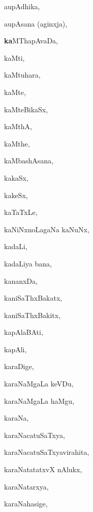 \begin{multicols}{3}
{\noindent
{aupAdhika}, \pageref{aupAdhika}

\noindent
{aupAsana (aginxja)}, \pageref{aupAsana (aginxja)}

\noindent
{{\large\textbf{ka}}MThapAvaDa}, \pageref{kaMThapAvaDa}

\noindent
{kaMti}, \pageref{kaMti}

\noindent
{kaMtuhara}, \pageref{kaMtuhara}

\noindent
{kaMte}, \pageref{kaMte}

\noindent
{kaMteBikaSx}, \pageref{kaMteBikaSx}

\noindent
{kaMthA}, \pageref{kaMthA}

\noindent
{kaMthe}, \pageref{kaMthe}

\noindent
{kaMbashAsana}, \pageref{kaMbashAsana}

\noindent
{kakaSx}, \pageref{kakaSx}

\noindent
{kakeSx}, \pageref{kakeSx}

\noindent
{kaTaTxLe}, \pageref{kaTaTxLe}

\noindent
{kaNiNxnoLagaNa kaNuNx}, \pageref{kaNiNxnoLagaNa kaNuNx}

\noindent
{kadaLi}, \pageref{kadaLi}

\noindent
{kadaLiya bana}, \pageref{kadaLiya bana}

\noindent
{kananxDa}, \pageref{kananxDa}

\noindent
{kaniSaThxBakatx}, \pageref{kaniSaThxBakatx}

\noindent
{kaniSaThxBakitx}, \pageref{kaniSaThxBakitx}

\noindent
{kapAlaBAti}, \pageref{kapAlaBAti}

\noindent
{kapAli}, \pageref{kapAli}

\noindent
{karaDige}, \pageref{karaDige}

\noindent
{karaNaMgaLa keVDu}, \pageref{karaNaMgaLa keVDu}

\noindent
{karaNaMgaLa haMgu}, \pageref{karaNaMgaLa haMgu}

\noindent
{karaNa}, \pageref{karaNa}

\noindent
{karaNacatuSaTxya}, \pageref{karaNacatuSaTxya}

\noindent
{karaNacatuSaTxyavirahita}, \pageref{karaNacatuSaTxyavirahita}

\noindent
{karaNatatatxvX nAlukx}, \pageref{karaNatatatxvX nAlukx}

\noindent
{karaNatarxya}, \pageref{karaNatarxya}

\noindent
{karaNahasige}, \pageref{karaNahasige}

}
\end{multicols}
